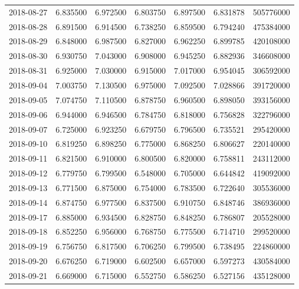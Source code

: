 \begin{tabular}{lrrrrrr}
2018-08-27 &    6.835500 &    6.972500 &    6.803750 &    6.897500 &    6.831878 &   505776000 \\
2018-08-28 &    6.891500 &    6.914500 &    6.738250 &    6.859500 &    6.794240 &   475384000 \\
2018-08-29 &    6.848000 &    6.987500 &    6.827000 &    6.962250 &    6.899785 &   420108000 \\
2018-08-30 &    6.930750 &    7.043000 &    6.908000 &    6.945250 &    6.882936 &   346608000 \\
2018-08-31 &    6.925000 &    7.030000 &    6.915000 &    7.017000 &    6.954045 &   306592000 \\
2018-09-04 &    7.003750 &    7.130500 &    6.975000 &    7.092500 &    7.028866 &   391720000 \\
2018-09-05 &    7.074750 &    7.110500 &    6.878750 &    6.960500 &    6.898050 &   393156000 \\
2018-09-06 &    6.944000 &    6.946500 &    6.784750 &    6.818000 &    6.756828 &   322796000 \\
2018-09-07 &    6.725000 &    6.923250 &    6.679750 &    6.796500 &    6.735521 &   295420000 \\
2018-09-10 &    6.819250 &    6.898250 &    6.775000 &    6.868250 &    6.806627 &   220140000 \\
2018-09-11 &    6.821500 &    6.910000 &    6.800500 &    6.820000 &    6.758811 &   243112000 \\
2018-09-12 &    6.779750 &    6.799500 &    6.548000 &    6.705000 &    6.644842 &   419092000 \\
2018-09-13 &    6.771500 &    6.875000 &    6.754000 &    6.783500 &    6.722640 &   305536000 \\
2018-09-14 &    6.874750 &    6.977500 &    6.837500 &    6.910750 &    6.848746 &   386936000 \\
2018-09-17 &    6.885000 &    6.934500 &    6.828750 &    6.848250 &    6.786807 &   205528000 \\
2018-09-18 &    6.852250 &    6.956000 &    6.768750 &    6.775500 &    6.714710 &   299520000 \\
2018-09-19 &    6.756750 &    6.817500 &    6.706250 &    6.799500 &    6.738495 &   224860000 \\
2018-09-20 &    6.676250 &    6.719000 &    6.602500 &    6.657000 &    6.597273 &   430584000 \\
2018-09-21 &    6.669000 &    6.715000 &    6.552750 &    6.586250 &    6.527156 &   435128000 \\

\end{tabular}
